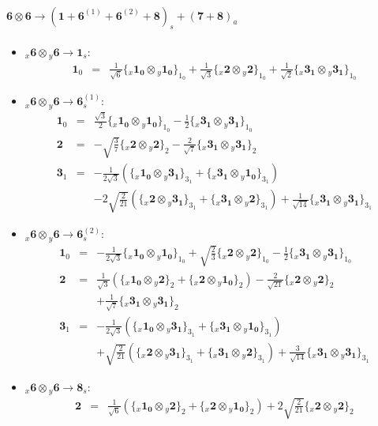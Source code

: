 \documentclass[english]{article}
\newcommand{\rep}[1]{\mathbf{#1}}
\newcommand{\repx}[2]{{}_{#2}\mathbf{#1}}
\newcommand{\subcg}[3]{\big\{ \repx{#1}{x}\otimes\repx{#2}{y}\big\}^{}_{#3}}
\begin{document}
\paragraph*{\Large $\rep{6}\otimes\rep{6}\to\left(\rep{1}+\rep{6}^{(1)}+\rep{6}^{(2)}+\rep{8}\right)_s+\left(\rep{7}+\rep{8}\right)_a$}
\begin{itemize}
\item $\repx{6}{x}\otimes\repx{6}{y}\to\rep{1}_{s}$:
\begin{eqnarray*}
\rep{1}_{0} &=& \frac{1}{\sqrt{6}}\subcg{1_{0}}{1_{0}}{1_{0}}+\frac{1}{\sqrt{3}}\subcg{2}{2}{1_{0}}+\frac{1}{\sqrt{2}}\subcg{3_{1}}{3_{1}}{1_{0}}
\end{eqnarray*}
\item $\repx{6}{x}\otimes\repx{6}{y}\to\rep{6}_{s}^{(1)}$:
\begin{eqnarray*}
\rep{1}_{0} &=& \frac{\sqrt{3}}{2}\subcg{1_{0}}{1_{0}}{1_{0}}-\frac{1}{2}\subcg{3_{1}}{3_{1}}{1_{0}}
\\
\rep{2} &=& -\sqrt{\frac{3}{7}}\subcg{2}{2}{2}-\frac{2}{\sqrt{7}}\subcg{3_{1}}{3_{1}}{2}
\\
\rep{3}_{1} &=& -\frac{1}{2 \sqrt{3}}\left(\subcg{1_{0}}{3_{1}}{3_{1}}+\subcg{3_{1}}{1_{0}}{3_{1}}\right) \\ 
 & & -2 \sqrt{\frac{2}{21}}\left(\subcg{2}{3_{1}}{3_{1}}+\subcg{3_{1}}{2}{3_{1}}\right)+\frac{1}{\sqrt{14}}\subcg{3_{1}}{3_{1}}{3_{1}}
\end{eqnarray*}
\item $\repx{6}{x}\otimes\repx{6}{y}\to\rep{6}_{s}^{(2)}$:
\begin{eqnarray*}
\rep{1}_{0} &=& -\frac{1}{2 \sqrt{3}}\subcg{1_{0}}{1_{0}}{1_{0}}+\sqrt{\frac{2}{3}}\subcg{2}{2}{1_{0}}-\frac{1}{2}\subcg{3_{1}}{3_{1}}{1_{0}}
\\
\rep{2} &=& \frac{1}{\sqrt{3}}\left(\subcg{1_{0}}{2}{2}+\subcg{2}{1_{0}}{2}\right)-\frac{2}{\sqrt{21}}\subcg{2}{2}{2} \\ 
 & & +\frac{1}{\sqrt{7}}\subcg{3_{1}}{3_{1}}{2}
\\
\rep{3}_{1} &=& -\frac{1}{2 \sqrt{3}}\left(\subcg{1_{0}}{3_{1}}{3_{1}}+\subcg{3_{1}}{1_{0}}{3_{1}}\right) \\ 
 & & +\sqrt{\frac{2}{21}}\left(\subcg{2}{3_{1}}{3_{1}}+\subcg{3_{1}}{2}{3_{1}}\right)+\frac{3}{\sqrt{14}}\subcg{3_{1}}{3_{1}}{3_{1}}
\end{eqnarray*}
\item $\repx{6}{x}\otimes\repx{6}{y}\to\rep{8}_{s}$:
\begin{eqnarray*}
\rep{2} &=& \frac{1}{\sqrt{6}}\left(\subcg{1_{0}}{2}{2}+\subcg{2}{1_{0}}{2}\right)+2 \sqrt{\frac{2}{21}}\subcg{2}{2}{2} \\ 

\end{eqnarray*}
\end{itemize}
\end{document}
